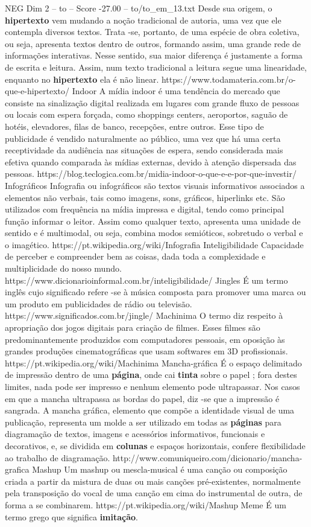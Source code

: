 \begin{textsample}{NEG Dim 2 – to – Score -27.00 – to/to\_em\_13.txt}
Desde sua origem, o \textbf{hipertexto} vem mudando a noção tradicional de autoria, uma vez que ele contempla diversos textos.
Trata -se, portanto, de uma espécie de obra coletiva, ou seja, apresenta textos dentro de outros, formando assim, uma grande rede de informações interativas.
Nesse sentido, sua maior diferença é justamente a forma de escrita e leitura.
Assim, num texto tradicional a leitura segue uma linearidade, enquanto no \textbf{hipertexto} ela é não linear. https://www.todamateria.com.br/o-que-e-hipertexto/ Indoor A mídia indoor é uma tendência do mercado que consiste na sinalização digital realizada em lugares com grande fluxo de pessoas ou locais com espera forçada, como shoppings centers, aeroportos, saguão de hotéis, elevadores, filas de banco, recepções, entre outros.
Esse tipo de publicidade é vendido naturalmente ao público, uma vez que há uma certa receptividade da audiência nas situações de espera, sendo considerada mais efetiva quando comparada às mídias externas, devido à atenção dispersada das pessoas. https://blog.teclogica.com.br/midia-indoor-o-que-e-e-por-que-investir/ Infográficos Infografia ou infográficos são textos visuais informativos associados a elementos não verbais, tais como imagens, sons, gráficos, hiperlinks etc.
São utilizados com frequência na mídia impressa e digital, tendo como principal função informar o leitor.
Assim como qualquer texto, apresenta uma unidade de sentido e é multimodal, ou seja, combina modos semióticos, sobretudo o verbal e o imagético. https://pt.wikipedia.org/wiki/Infografia Inteligibilidade Capacidade de perceber e compreender bem as coisas, dada toda a complexidade e multiplicidade do nosso mundo. https://www.dicionarioinformal.com.br/inteligibilidade/ Jingles É um termo inglês cujo significado refere -se à música composta para promover uma marca ou um produto em publicidades de rádio ou televisão. https://www.significados.com.br/jingle/ Machinima O termo diz respeito à apropriação dos jogos digitais para criação de filmes.
Esses filmes são predominantemente produzidos com computadores pessoais, em oposição às grandes produções cinematográficas que usam softwares em 3D profissionais. https://pt.wikipedia.org/wiki/Machinima Mancha-gráfica É o espaço delimitado de impressão dentro de uma \textbf{página}, onde cai \textbf{tinta} sobre o papel ; fora destes limites, nada pode ser impresso e nenhum elemento pode ultrapassar.
Nos casos em que a mancha ultrapassa as bordas do papel, diz -se que a impressão é sangrada.
A mancha gráfica, elemento que compõe a identidade visual de uma publicação, representa um molde a ser utilizado em todas as \textbf{páginas} para diagramação de textos, imagens e acessórios informativos, funcionais e decorativos, e, se dividida em \textbf{colunas} e espaços horizontais, confere flexibilidade ao trabalho de diagramação. http://www.comuniqueiro.com/dicionario/mancha-grafica Mashup Um mashup ou mescla-musical é uma canção ou composição criada a partir da mistura de duas ou mais canções pré-existentes, normalmente pela transposição do vocal de uma canção em cima do instrumental de outra, de forma a se combinarem. https://pt.wikipedia.org/wiki/Mashup Meme É um termo grego que significa \textbf{imitação}.

\end{textsample}
